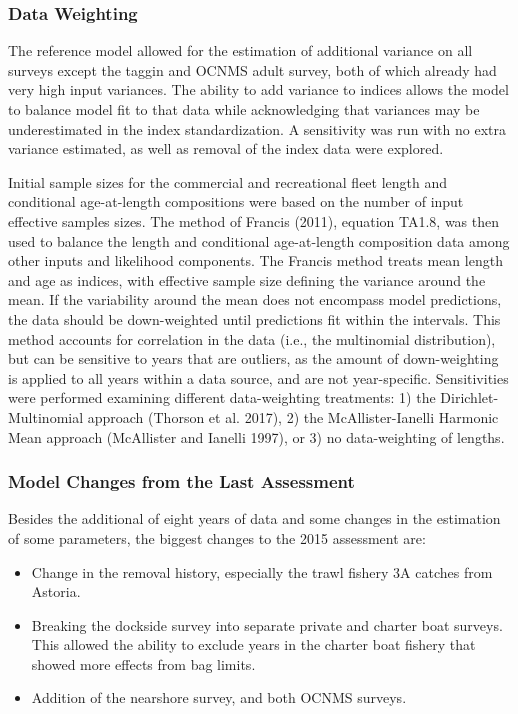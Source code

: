 \documentclass[11pt,
  english,
  letterpaper,
]{article}
\providecommand{\tightlist}{%
  \setlength{\itemsep}{0pt}\setlength{\parskip}{0pt}}
\providecommand{\tightlist}{%
  \setlength{\itemsep}{0pt}\setlength{\parskip}{0pt}}
\begin{document}
\hypertarget{data-weighting}{%
\subsubsection{Data Weighting}\label{data-weighting}}

The reference model allowed for the estimation of additional variance on all surveys except the taggin and OCNMS adult survey, both of which already had very high input variances. The ability to add variance to indices allows the model to balance model fit to that data while acknowledging that variances may be underestimated in the index standardization. A sensitivity was run with no extra variance estimated, as well as removal of the index data were explored.

Initial sample sizes for the commercial and recreational fleet length and conditional age-at-length compositions were based on the number of input effective samples sizes. The method of Francis (2011), equation TA1.8, was then used to balance the length and conditional age-at-length composition data among other inputs and likelihood components. The Francis method treats mean length and age as indices, with effective sample size defining the variance around the mean. If the variability around the mean does not encompass model predictions, the data should be down-weighted until predictions fit within the intervals. This method accounts for correlation in the data (i.e., the multinomial distribution), but can be sensitive to years that are outliers, as the amount of down-weighting is applied to all years within a data source, and are not year-specific. Sensitivities were performed examining different data-weighting treatments: 1) the Dirichlet-Multinomial approach (Thorson et al. 2017), 2) the McAllister-Ianelli Harmonic Mean approach (McAllister and Ianelli 1997), or 3) no data-weighting of lengths.

\hypertarget{model-changes-from-the-last-assessment}{%
\subsubsection{Model Changes from the Last Assessment}\label{model-changes-from-the-last-assessment}}

Besides the additional of eight years of data and some changes in the estimation of some parameters, the biggest changes to the 2015 assessment are:

\begin{itemize}
\tightlist
\item
  Change in the removal history, especially the trawl fishery 3A catches from Astoria.
\item
  Breaking the dockside survey into separate private and charter boat surveys. This allowed the ability to exclude years in the charter boat fishery that showed more effects from bag limits.
\item
  Addition of the nearshore survey, and both OCNMS surveys.
\end{itemize}
\end{document}
